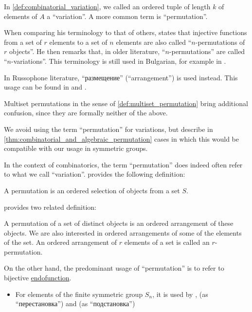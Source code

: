 \begin{remark}\label{rem:combinatorial_permutation_terminology}
  In \cref{def:combinatorial_variation}, we called an ordered tuple of length \( k \) of elements of \( A \) a \enquote{variation}. A more common term is \enquote{permutation}.

  When comparing his terminology to that of others,  states that injective functions from a set of \( r \) elements to a set of \( n \) elements are also called \enquote{\( n \)-permutations of \( r \) objects}. He then remarks that, in older literature, \enquote{\( n \)-permutations} are called \enquote{\( n \)-variations}. This terminology is still used in Bulgarian, for example in \cite[27]{ДимитровЯнев2007ВероятностиИСтатистика}.

  In Russophone literature, \enquote{размещение} (\enquote{arrangement}) is used instead. This usage can be found in  and .

  Multiset permutations in the sense of \cref{def:multiset_permutation} bring additional confusion, since they are formally neither of the above.

  We avoid using the term \enquote{permutation} for variations, but describe in \cref{thm:combinatorial_and_algebraic_permutation} cases in which this would be compatible with our usage in symmetric groups.

  In the context of combinatorics, the term \enquote{permutation} does indeed often refer to what we call \enquote{variation}.  provides the following definition:
  \begin{displayquote}
    A permutation is an ordered selection of objects from a set \( S \).
  \end{displayquote}

   provides two related definition:
  \begin{displayquote}
    A permutation of a set of distinct objects is an ordered arrangement of these objects. We are also interested in ordered arrangements of some of the elements of the set. An ordered arrangement of \( r \) elements of a set is called an \( r \)-permutation.
  \end{displayquote}

  On the other hand, the predominant usage of \enquote{permutation} is to refer to bijective \hyperref[def:function/endofunction]{endofunction}.
  \begin{itemize}
    \item For elements of the finite symmetric group \( S_n \), it is used by
    ,
     (as \enquote{перестановка}) and
     (as \enquote{подстановка})


\end{itemize}
\end{remark}
